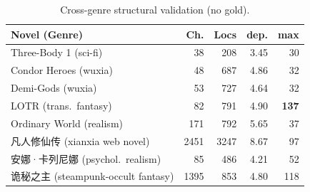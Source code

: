 \documentclass[11pt]{article}
\newenvironment{CJK}[2]{}{}
\begin{document}
\begin{table}[H]
\centering
\scriptsize
\setlength{\tabcolsep}{2.5pt}
\begin{tabular}{lrrrr}
\toprule
\textbf{Novel (Genre)} & \textbf{Ch.} & \textbf{Locs} & \textbf{dep.} & \textbf{max} \\
\midrule
Three-Body 1 (sci-fi) & 38 & 208 & 3.45 & 30 \\
Condor Heroes (wuxia) & 48 & 687 & 4.86 & 32 \\
Demi-Gods (wuxia) & 53 & 727 & 4.64 & 32 \\
LOTR (trans.\ fantasy) & 82 & 791 & 4.90 & \textbf{137} \\
Ordinary World (realism) & 171 & 792 & 5.65 & 37 \\
\begin{CJK}{UTF8}{gbsn}凡人修仙传\end{CJK} (xianxia web novel) & 2451 & 3247 & 8.67 & 97 \\
\begin{CJK}{UTF8}{gbsn}安娜·卡列尼娜\end{CJK} (psychol.\ realism) & 85 & 486 & 4.21 & 52 \\
\begin{CJK}{UTF8}{gbsn}诡秘之主\end{CJK} (steampunk-occult fantasy) & 1395 & 853 & 4.80 & 118 \\
\bottomrule
\end{tabular}
\caption{Cross-genre structural validation (no gold).}
\label{tab:cross}
\end{table}
\end{document}
